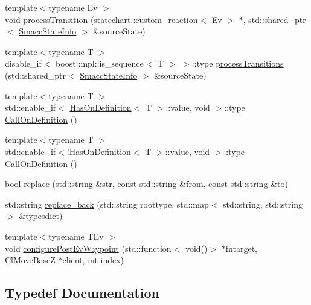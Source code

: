 \begin{DoxyCompactItemize}
\item 
{\footnotesize template$<$typename Ev $>$ }\\void \hyperlink{namespacesmacc_a1f165532f9a9126db41900fbf23a985d}{process\+Transition} (statechart\+::custom\+\_\+reaction$<$ Ev $>$ $\ast$, std\+::shared\+\_\+ptr$<$ \hyperlink{classsmacc_1_1SmaccStateInfo}{Smacc\+State\+Info} $>$ \&source\+State)
\item 
{\footnotesize template$<$typename T $>$ }\\disable\+\_\+if$<$ boost\+::mpl\+::is\+\_\+sequence$<$ T $>$ $>$\+::type \hyperlink{namespacesmacc_a097ffb8059d48bbe45ee8321e92e8878}{process\+Transitions} (std\+::shared\+\_\+ptr$<$ \hyperlink{classsmacc_1_1SmaccStateInfo}{Smacc\+State\+Info} $>$ \&source\+State)
\item 
{\footnotesize template$<$typename T $>$ }\\std\+::enable\+\_\+if$<$ \hyperlink{classsmacc_1_1HasOnDefinition}{Has\+On\+Definition}$<$ T $>$\+::value, void $>$\+::type \hyperlink{namespacesmacc_a380bcca82a996c6c88868251206ad420}{Call\+On\+Definition} ()
\item 
{\footnotesize template$<$typename T $>$ }\\std\+::enable\+\_\+if$<$!\hyperlink{classsmacc_1_1HasOnDefinition}{Has\+On\+Definition}$<$ T $>$\+::value, void $>$\+::type \hyperlink{namespacesmacc_a52c5d314d71f6a1d8658c6f1d26d9135}{Call\+On\+Definition} ()
\item 
\hyperlink{classbool}{bool} \hyperlink{namespacesmacc_af160907752916d32be9c40dc95cd29e0}{replace} (std\+::string \&str, const std\+::string \&from, const std\+::string \&to)
\item 
std\+::string \hyperlink{namespacesmacc_a72fcb6f2d23e716a772176e79495bc53}{replace\+\_\+back} (std\+::string roottype, std\+::map$<$ std\+::string, std\+::string $>$ \&typesdict)
\item 
{\footnotesize template$<$typename T\+Ev $>$ }\\void \hyperlink{namespacesmacc_a12e26ded70efbdd533dc8573f9068991}{configure\+Post\+Ev\+Waypoint} (std\+::function$<$ void()$>$ $\ast$fntarget, \hyperlink{classsmacc_1_1ClMoveBaseZ}{Cl\+Move\+BaseZ} $\ast$client, int index)
\end{DoxyCompactItemize}


\subsection{Typedef Documentation}

